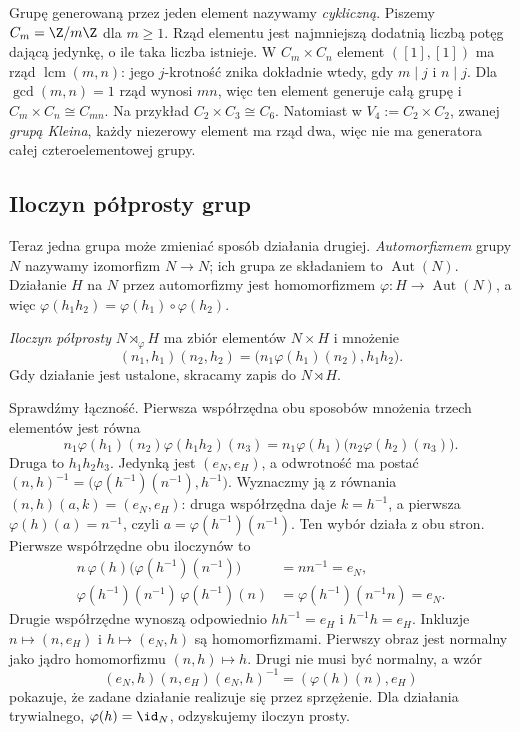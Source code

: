 \begin{przyklad}
Grupę generowaną przez jeden element nazywamy \emph{cykliczną}.
Piszemy $C_m=\Z/m\Z$ dla $m\geq1$. Rząd elementu jest najmniejszą
dodatnią liczbą potęg dającą jedynkę, o ile taka liczba istnieje.
W $C_m\times C_n$ element $([1],[1])$ ma rząd
$\operatorname{lcm}(m,n)$: jego $j$-krotność znika dokładnie wtedy,
gdy $m\mid j$ i $n\mid j$. Dla $\gcd(m,n)=1$ rząd wynosi $mn$,
więc ten element generuje całą grupę i $C_m\times C_n\cong C_{mn}$.
Na przykład $C_2\times C_3\cong C_6$. Natomiast w
$V_4:=C_2\times C_2$, zwanej \emph{grupą Kleina}, każdy niezerowy
element ma rząd dwa, więc nie ma generatora całej czteroelementowej grupy.
\end{przyklad}

\subsection*{Iloczyn półprosty grup}

Teraz jedna grupa może zmieniać sposób działania drugiej.
\emph{Automorfizmem} grupy $N$ nazywamy izomorfizm $N\to N$;
ich grupa ze składaniem to $\operatorname{Aut}(N)$.
Działanie $H$ na $N$ przez automorfizmy jest homomorfizmem
$\varphi:H\to\operatorname{Aut}(N)$, a więc
$\varphi(h_1h_2)=\varphi(h_1)\circ\varphi(h_2)$.

\begin{definicja}
\emph{Iloczyn półprosty} $N\rtimes_\varphi H$ ma zbiór elementów
$N\times H$ i mnożenie
\[
 (n_1,h_1)(n_2,h_2)
 =\bigl(n_1\varphi(h_1)(n_2),h_1h_2\bigr).
\]
Gdy działanie jest ustalone, skracamy zapis do $N\rtimes H$.
\end{definicja}

Sprawdźmy łączność. Pierwsza współrzędna obu sposobów mnożenia
trzech elementów jest równa
\[
 n_1\varphi(h_1)(n_2)\varphi(h_1h_2)(n_3)
 =n_1\varphi(h_1)\bigl(n_2\varphi(h_2)(n_3)\bigr).
\]
Druga to $h_1h_2h_3$. Jedynką jest $(e_N,e_H)$, a odwrotność
ma postać $(n,h)^{-1}=\bigl(\varphi(h^{-1})(n^{-1}),h^{-1}\bigr)$.
Wyznaczmy ją z równania $(n,h)(a,k)=(e_N,e_H)$:
druga współrzędna daje $k=h^{-1}$, a pierwsza
$\varphi(h)(a)=n^{-1}$, czyli $a=\varphi(h^{-1})(n^{-1})$.
Ten wybór działa z obu stron. Pierwsze współrzędne obu iloczynów to
\[
 \begin{aligned}
 n\,\varphi(h)\bigl(\varphi(h^{-1})(n^{-1})\bigr)
 &=nn^{-1}=e_N,\\
 \varphi(h^{-1})(n^{-1})\,\varphi(h^{-1})(n)
 &=\varphi(h^{-1})(n^{-1}n)=e_N.
 \end{aligned}
\]
Drugie współrzędne wynoszą odpowiednio $hh^{-1}=e_H$ i $h^{-1}h=e_H$.
Inkluzje $n\mapsto(n,e_H)$ i $h\mapsto(e_N,h)$ są homomorfizmami.
Pierwszy obraz jest normalny jako jądro homomorfizmu
$(n,h)\mapsto h$. Drugi nie musi być normalny, a wzór
\[
 (e_N,h)(n,e_H)(e_N,h)^{-1}=(\varphi(h)(n),e_H)
\]
pokazuje, że zadane działanie realizuje się przez sprzężenie.
Dla działania trywialnego, $\varphi(h)=\id_N$, odzyskujemy iloczyn prosty.

